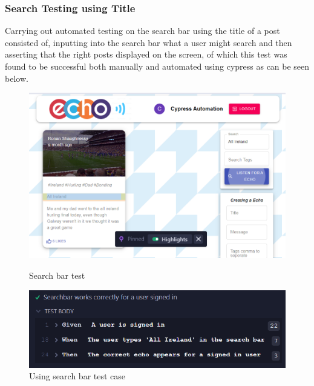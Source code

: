 \subsubsection{Search Testing using Title}
Carrying out automated testing on the search bar using the title of a post consisted of, inputting into the search bar what a user might search and then asserting that the right posts displayed on the screen, of which this test was found to be successful both manually and automated using cypress as can be seen below.

\begin{figure}[ht]
    \hspace{0.5cm}
    \begin{minipage}[b]{0.3\linewidth}
    \centering
   \includegraphics[width=\linewidth]{images/SearchTestSignedIn}
    \caption{Search bar test}
    \label{image:SearchTestSignedIn}
\end{minipage}
    \hspace{0.5cm}
    \begin{minipage}[b]{0.5\linewidth}
    \centering
   \includegraphics[width=\linewidth]{images/SignedInSeach}
    \caption{Using search bar test case}
    \label{image:SignedInSeach}
\end{minipage}
\end{figure}

